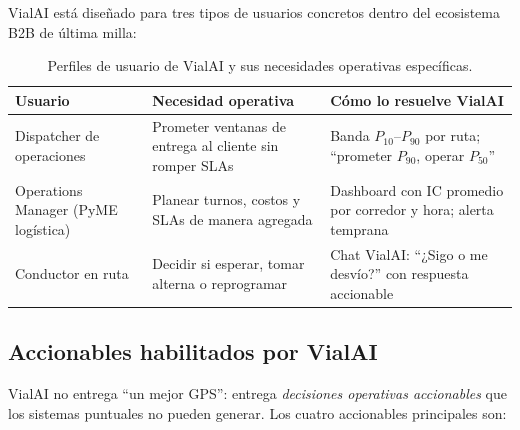 \documentclass[11pt,a4paper]{article}
\begin{document}
VialAI está diseñado para tres tipos de usuarios concretos dentro del ecosistema B2B de última milla:

\begin{table}[H]
\centering
\small
\renewcommand{\arraystretch}{1.3}
\begin{tabular}{@{}p{3.2cm}p{5cm}p{5cm}@{}}
\toprule
\textbf{Usuario} & \textbf{Necesidad operativa} & \textbf{Cómo lo resuelve VialAI} \\
\midrule
Dispatcher de operaciones & Prometer ventanas de entrega al cliente sin romper SLAs & Banda $P_{10}$--$P_{90}$ por ruta; ``prometer $P_{90}$, operar $P_{50}$'' \\
Operations Manager (PyME logística) & Planear turnos, costos y SLAs de manera agregada & Dashboard con IC promedio por corredor y hora; alerta temprana \\
Conductor en ruta & Decidir si esperar, tomar alterna o reprogramar & Chat VialAI: ``¿Sigo o me desvío?'' con respuesta accionable \\
\bottomrule
\end{tabular}
\caption{Perfiles de usuario de VialAI y sus necesidades operativas específicas.}
\label{tab:usuarios}
\end{table}

\subsection{Accionables habilitados por VialAI}

VialAI no entrega ``un mejor GPS'': entrega \textit{decisiones operativas accionables} que los sistemas puntuales no pueden generar. Los cuatro accionables principales son:
\end{document}
